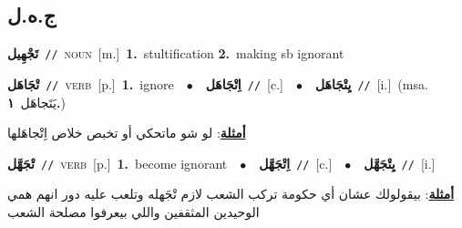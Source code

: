 \documentclass[10pt,a4paper,twoside]{article} %
\begin{document}
\begin{multicols}{2}
\vspace{-3mm}
\subsection*{\color{blue}\foreignlanguage{arabic}{ج.ه.ل}\color{blue}{}} 

{\setlength\topsep{0pt}\textbf{\foreignlanguage{arabic}{تَجْهِيل}}\ {\color{gray}\texttt{//}\color{black}}\ \textsc{noun}\ [m.]\ \textbf{1.}~stultification  \textbf{2.}~making sb ignorant\ } \vspace{2mm}

{\setlength\topsep{0pt}\textbf{\foreignlanguage{arabic}{تْجَاهَل}}\ {\color{gray}\texttt{//}\color{black}}\ \textsc{verb}\ [p.]\ \textbf{1.}~ignore\ \ $\bullet$\ \ \setlength\topsep{0pt}\textbf{\foreignlanguage{arabic}{اِتْجَاهَل}}\ {\color{gray}\texttt{//}\color{black}}\ [c.]\ \ $\bullet$\ \ \setlength\topsep{0pt}\textbf{\foreignlanguage{arabic}{يِتْجَاهَل}}\ {\color{gray}\texttt{//}\color{black}}\ [i.]\ \color{gray}(msa. \foreignlanguage{arabic}{يَتَجاهَل}~\foreignlanguage{arabic}{\textbf{١.}})\color{black}\  \begin{flushright}\color{gray}\foreignlanguage{arabic}{\textbf{\underline{\foreignlanguage{arabic}{أمثلة}}}: لو شو ماتحكي أو تخبص خلاص اِتْجاهَلها}\end{flushright}\color{black}} \vspace{2mm}

{\setlength\topsep{0pt}\textbf{\foreignlanguage{arabic}{تْجَهَّل}}\ {\color{gray}\texttt{//}\color{black}}\ \textsc{verb}\ [p.]\ \textbf{1.}~become ignorant\ \ $\bullet$\ \ \setlength\topsep{0pt}\textbf{\foreignlanguage{arabic}{اِتْجَهَّل}}\ {\color{gray}\texttt{//}\color{black}}\ [c.]\ \ $\bullet$\ \ \setlength\topsep{0pt}\textbf{\foreignlanguage{arabic}{يِتْجَهَّل}}\ {\color{gray}\texttt{//}\color{black}}\ [i.]\  \begin{flushright}\color{gray}\foreignlanguage{arabic}{\textbf{\underline{\foreignlanguage{arabic}{أمثلة}}}: بيقولولك عشان أي حكومة تركب الشعب لازم تْجَهله وتلعب عليه دور انهم همي الوحيدين المثقفين واللي بيعرفوا مصلحة الشعب}\end{flushright}\color{black}} \vspace{2mm}


\end{multicols}
\end{document}
